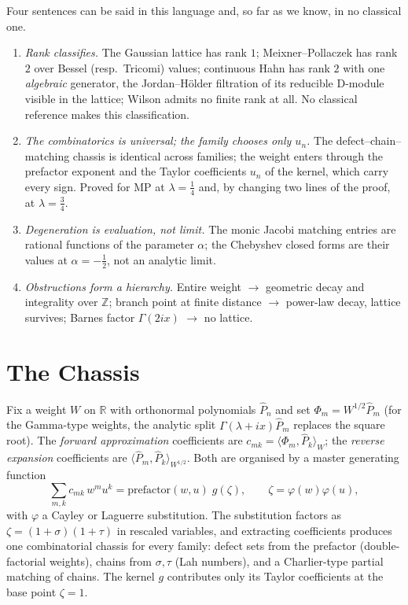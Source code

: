 \documentclass[11pt,a4paper]{article}
\newcommand{\R}{\mathbb{R}}
\newcommand{\Z}{\mathbb{Z}}
\begin{document}
Four sentences can be said in this language and, so far as we know, in
no classical one.

\begin{enumerate}
\item \emph{Rank classifies.} The Gaussian lattice has rank $1$;
Meixner--Pollaczek has rank $2$ over Bessel (resp.\ Tricomi) values;
continuous Hahn has rank $2$ with one \emph{algebraic} generator, the
Jordan--H\"older filtration of its reducible D-module visible in the
lattice; Wilson admits no finite rank at all. No classical reference
makes this classification.
\item \emph{The combinatorics is universal; the family chooses only
$u_n$.} The defect--chain--matching chassis is identical across
families; the weight enters through the prefactor exponent and the
Taylor coefficients $u_n$ of the kernel, which carry every sign.
Proved for MP at $\lambda=\tfrac14$ and, by changing two lines of the
proof, at $\lambda=\tfrac34$.
\item \emph{Degeneration is evaluation, not limit.} The monic Jacobi
matching entries are rational functions of the parameter $\alpha$; the
Chebyshev closed forms are their values at $\alpha=-\tfrac12$, not an
analytic limit.
\item \emph{Obstructions form a hierarchy.} Entire weight $\to$
geometric decay and integrality over $\Z$; branch point at finite
distance $\to$ power-law decay, lattice survives; Barnes factor
$\Gamma(2ix)$ $\to$ no lattice.
\end{enumerate}

\section{The Chassis}

Fix a weight $W$ on $\R$ with orthonormal polynomials $\widehat{P}_n$
and set $\Phi_m = W^{1/2}\widehat{P}_m$ (for the Gamma-type weights, the
analytic split $\Gamma(\lambda+ix)\widehat{P}_m$ replaces the square
root). The \emph{forward approximation} coefficients are
$c_{mk} = \langle \Phi_m, \widehat{P}_k\rangle_W$; the \emph{reverse
expansion} coefficients are
$\langle \widehat{P}_m, \widehat{P}_k \rangle_{W^{1/2}}$. Both are
organised by a master generating function
\[
  \sum_{m,k} c_{mk}\, w^m u^k
  = \text{prefactor}(w,u)\; g(\zeta), \qquad \zeta = \varphi(w)\varphi(u),
\]
with $\varphi$ a Cayley or Laguerre substitution. The substitution
factors as $\zeta = (1+\sigma)(1+\tau)$ in rescaled variables, and
extracting coefficients produces one combinatorial chassis for every
family: defect sets from the prefactor (double-factorial weights),
chains from $\sigma,\tau$ (Lah numbers), and a Charlier-type partial
matching of chains. The kernel $g$ contributes only its Taylor
coefficients at the base point $\zeta=1$.
\end{document}
